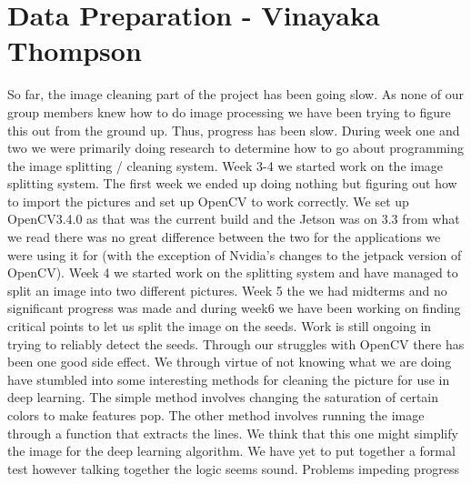\documentclass[onecolumn, draftclsnofoot,10pt, compsoc]{IEEEtran}
\begin{document}
\section{Data Preparation - Vinayaka Thompson}
So far, the image cleaning part of the project has been going slow. As none of our group members knew how to do image processing we have been trying to figure this out from the ground up. Thus, progress has been slow. During week one and two we were primarily doing research to determine how to go about programming the image splitting / cleaning system. Week 3-4 we started work on the image splitting system. The first week we ended up doing nothing but figuring out how to import the pictures and set up OpenCV to work correctly. We set up OpenCV3.4.0 as that was the current build and the Jetson was on 3.3 from what we read there was no great difference between the two for the applications we were using it for (with the exception of Nvidia’s changes to the jetpack version of OpenCV). Week 4 we started work on the splitting system and have managed to split an image into two different pictures. Week 5 the we had midterms and no significant progress was made and during week6 we have been working on finding critical points to let us split the image on the seeds. Work is still ongoing in trying to reliably detect the seeds. 
Through our struggles with OpenCV there has been one good side effect. We through virtue of not knowing what we are doing have stumbled into some interesting methods for cleaning the picture for use in deep learning. The simple method involves changing the saturation of certain colors to make features pop. The other method involves running the image through a function that extracts the lines. We think that this one might simplify the image for the deep learning algorithm. We have yet to put together a formal test however talking together the logic seems sound. 
Problems impeding progress 
\end{document}

